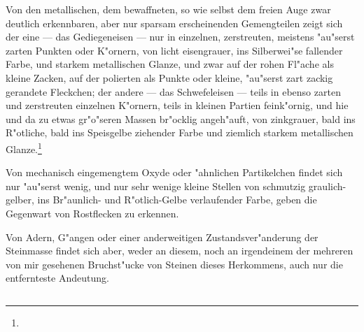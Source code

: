 \documentclass[a4paper, 11pt, oneside, german]{article}
\begin{document}
Von den metallischen, dem bewaffneten, so wie selbst dem freien Auge zwar deutlich erkennbaren, aber nur sparsam erscheinenden Gemengteilen zeigt sich der eine --- das Gediegeneisen --- nur in einzelnen, zerstreuten, meistens "au"serst zarten Punkten oder K"ornern, von licht eisengrauer, ins Silberwei"se fallender Farbe, und starkem metallischen Glanze, und zwar auf der rohen Fl"ache als kleine Zacken, auf der polierten als Punkte oder kleine, "au"serst zart zackig gerandete Fleckchen; der andere --- das Schwefeleisen --- teils in ebenso zarten und zerstreuten einzelnen K"ornern, teils in kleinen Partien feink"ornig, und hie und da zu etwas gr"o"seren Massen br"ocklig angeh"auft, von zinkgrauer, bald ins R"otliche, bald ins Speisgelbe ziehender Farbe und ziemlich starkem metallischen Glanze.\footnote{}

Von mechanisch eingemengtem Oxyde oder "ahnlichen Partikelchen findet sich nur "au"serst wenig, und nur sehr wenige kleine Stellen von schmutzig graulich-gelber, ins Br"aunlich- und R"otlich-Gelbe verlaufender Farbe, geben die Gegenwart von Rostflecken zu erkennen.

Von Adern, G"angen oder einer anderweitigen Zustandsver"anderung der Steinmasse findet sich aber, weder an diesem, noch an irgendeinem der mehreren von mir gesehenen Bruchst"ucke von Steinen dieses Herkommens, auch nur die entfernteste Andeutung.

\subsection{}
\end{document}
